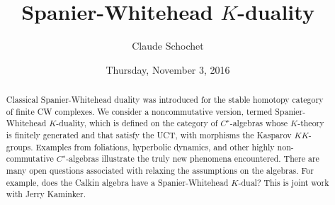 \documentclass{UAmathtalk}
\author{Claude Schochet}
\title{Spanier-Whitehead $K$-duality}
\date{Thursday, November 3, 2016}
\begin{document}
\maketitle

\begin{abstract}
Classical Spanier-Whitehead duality was introduced for the stable homotopy category of finite CW complexes. We consider a noncommutative version, termed Spanier-Whitehead $K$-duality, which is defined on the category of $C^∗$-algebras whose $K$-theory is finitely generated and that satisfy the UCT, with morphisms the Kasparov $\mathit{KK}$-groups. Examples from foliations, hyperbolic dynamics, and other highly non-commutative $C^∗$-algebras illustrate the truly new phenomena encountered. There are many open questions associated with relaxing the assumptions on the algebras. For example, does the Calkin algebra have a Spanier-Whitehead $K$-dual? This is joint work with Jerry
Kaminker.
\end{abstract}
\end{document}

